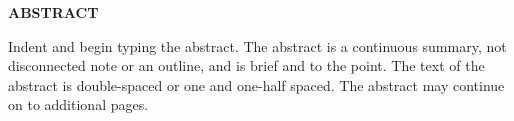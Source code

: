 {}
\begin{center}
    \textbf{ABSTRACT}
\end{center}

Indent and begin typing the abstract. The abstract is a continuous summary, not
disconnected note or an outline, and is brief and to the point. The text of the abstract is
double-spaced or one and one-half spaced. The abstract may continue on to additional
pages.
